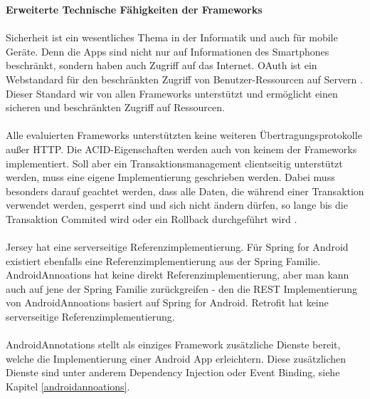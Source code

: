{\large \textbf{Erweiterte Technische Fähigkeiten der Frameworks}}\\\\
Sicherheit ist ein wesentliches Thema in der Informatik und auch für mobile Geräte. Denn die Apps sind nicht nur auf Informationen des Smartphones beschränkt, sondern haben auch Zugriff auf das Internet. OAuth ist ein Webstandard für den beschränkten Zugriff von Benutzer-Ressourcen auf Servern \cite{shehab:secure}. Dieser Standard wir von allen Frameworks unterstützt und ermöglicht einen sicheren und beschränkten Zugriff auf Ressourcen. 
\\\\
Alle evaluierten Frameworks unterstützten keine weiteren Übertragungsprotokolle außer HTTP. Die ACID-Eigenschaften werden auch von keinem der Frameworks implementiert. Soll aber ein Transaktionsmanagement clientseitig unterstützt werden, muss eine eigene Implementierung geschrieben werden. Dabei muss besonders darauf geachtet werden, dass alle Daten, die während einer Transaktion verwendet werden, gesperrt sind und sich nicht ändern dürfen, so lange bis die Transaktion Commited wird oder ein Rollback durchgeführt wird \cite{braun:Transaktionen}.
\\\\
Jersey hat eine serverseitige Referenzimplementierung. Für Spring for Android existiert ebenfalls eine Referenzimplementierung aus der Spring Familie. AndroidAnnoations hat keine direkt Referenzimplementierung, aber man kann auch auf jene der Spring Familie zurückgreifen - den die REST Implementierung von AndroidAnnoations basiert auf Spring for Android. Retrofit hat keine serverseitige Referenzimplementierung.
\\\\
AndroidAnnotations stellt als einziges Framework zusätzliche Dienste bereit, welche die Implementierung einer Android App erleichtern. Diese zusätzlichen Dienste sind unter anderem Dependency Injection oder Event Binding, siehe Kapitel \ref{androidannoations}.

